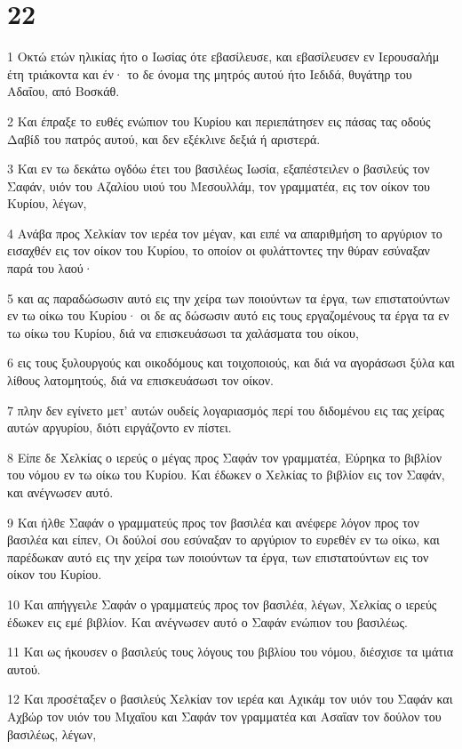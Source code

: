 \chapter{22}

\par 1 Οκτώ ετών ηλικίας ήτο ο Ιωσίας ότε εβασίλευσε, και εβασίλευσεν εν Ιερουσαλήμ έτη τριάκοντα και έν· το δε όνομα της μητρός αυτού ήτο Ιεδιδά, θυγάτηρ του Αδαΐου, από Βοσκάθ.
\par 2 Και έπραξε το ευθές ενώπιον του Κυρίου και περιεπάτησεν εις πάσας τας οδούς Δαβίδ του πατρός αυτού, και δεν εξέκλινε δεξιά ή αριστερά.
\par 3 Και εν τω δεκάτω ογδόω έτει του βασιλέως Ιωσία, εξαπέστειλεν ο βασιλεύς τον Σαφάν, υιόν του Αζαλίου υιού του Μεσουλλάμ, τον γραμματέα, εις τον οίκον του Κυρίου, λέγων,
\par 4 Ανάβα προς Χελκίαν τον ιερέα τον μέγαν, και ειπέ να απαριθμήση το αργύριον το εισαχθέν εις τον οίκον του Κυρίου, το οποίον οι φυλάττοντες την θύραν εσύναξαν παρά του λαού·
\par 5 και ας παραδώσωσιν αυτό εις την χείρα των ποιούντων τα έργα, των επιστατούντων εν τω οίκω του Κυρίου· οι δε ας δώσωσιν αυτό εις τους εργαζομένους τα έργα τα εν τω οίκω του Κυρίου, διά να επισκευάσωσι τα χαλάσματα του οίκου,
\par 6 εις τους ξυλουργούς και οικοδόμους και τοιχοποιούς, και διά να αγοράσωσι ξύλα και λίθους λατομητούς, διά να επισκευάσωσι τον οίκον.
\par 7 πλην δεν εγίνετο μετ' αυτών ουδείς λογαριασμός περί του διδομένου εις τας χείρας αυτών αργυρίου, διότι ειργάζοντο εν πίστει.
\par 8 Είπε δε Χελκίας ο ιερεύς ο μέγας προς Σαφάν τον γραμματέα, Εύρηκα το βιβλίον του νόμου εν τω οίκω του Κυρίου. Και έδωκεν ο Χελκίας το βιβλίον εις τον Σαφάν, και ανέγνωσεν αυτό.
\par 9 Και ήλθε Σαφάν ο γραμματεύς προς τον βασιλέα και ανέφερε λόγον προς τον βασιλέα και είπεν, Οι δούλοί σου εσύναξαν το αργύριον το ευρεθέν εν τω οίκω, και παρέδωκαν αυτό εις την χείρα των ποιούντων τα έργα, των επιστατούντων εις τον οίκον του Κυρίου.
\par 10 Και απήγγειλε Σαφάν ο γραμματεύς προς τον βασιλέα, λέγων, Χελκίας ο ιερεύς έδωκεν εις εμέ βιβλίον. Και ανέγνωσεν αυτό ο Σαφάν ενώπιον του βασιλέως.
\par 11 Και ως ήκουσεν ο βασιλεύς τους λόγους του βιβλίου του νόμου, διέσχισε τα ιμάτια αυτού.
\par 12 Και προσέταξεν ο βασιλεύς Χελκίαν τον ιερέα και Αχικάμ τον υιόν του Σαφάν και Αχβώρ τον υιόν του Μιχαΐου και Σαφάν τον γραμματέα και Ασαΐαν τον δούλον του βασιλέως, λέγων,
